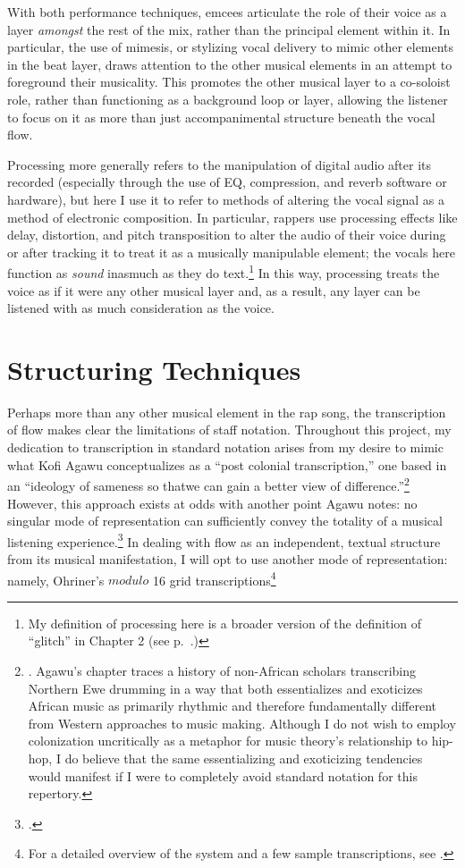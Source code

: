 With both performance techniques, emcees articulate the role of their voice as a layer \emph{amongst} the rest 
of the mix, rather than the principal element within it. In particular, the use of mimesis, or stylizing vocal 
delivery to mimic other elements in the beat layer, draws attention to the other musical elements in an attempt
to foreground their musicality. This promotes the other musical layer to a co-soloist role, rather than 
functioning as a background loop or layer, allowing the listener to focus on it as more than just accompanimental
structure beneath the vocal flow.

Processing more generally refers to the manipulation of digital audio after its recorded (especially through
the use of EQ, compression, and reverb software or hardware), but here I use it to refer to methods of altering
the vocal signal as a method of electronic composition. In particular, rappers use processing effects like delay, 
distortion, and pitch transposition to alter the audio of their voice during or after tracking it to treat it 
as a musically manipulable element; the vocals here function as \emph{sound} inasmuch as they do text.\footnote{
    My definition of processing here is a broader version of the definition of ``glitch'' in Chapter 2 
    (see p.~\pageref{glitch}.)}
In this way, processing treats the voice as if it were any other musical layer and, as a result, any layer can
be listened with as much consideration as the voice.


\section{Structuring Techniques}
Perhaps more than any other musical element in the rap song, the transcription of flow makes clear the
limitations of staff notation. Throughout this project, my dedication to transcription in standard notation
arises from my desire to mimic what Kofi Agawu conceptualizes as a ``post colonial transcription,'' one based
in an ``ideology of sameness so that\textellipsis we can gain a better view of difference.''\footnote{
    \autocite[67]{kofiagawuInventionAfricanRhythm2003}. Agawu's chapter traces a history of non-African scholars
    transcribing Northern Ewe drumming in a way that both essentializes and exoticizes African music as primarily
    rhythmic and therefore fundamentally different from Western approaches to music making. Although I do not wish
    to employ colonization uncritically as a metaphor for music theory's relationship to hip-hop, I do believe that
    the same essentializing and exoticizing tendencies would manifest if I were to completely avoid standard notation
    for this repertory.}
However, this approach exists at odds with another point Agawu notes: no singular mode of representation can 
sufficiently convey the totality of a musical listening experience.\footnote{
    \autocite[187]{kofiagawuAfricanRhythmNorthern1995}.}
In dealing with flow as an independent, textual structure from its musical manifestation, I will opt to use
another mode of representation: namely, Ohriner's $modulo$ 16 grid transcriptions\footnote{
    For a detailed overview of the system and a few sample transcriptions, see 
    \autocite[xxviii--xl, 7--9]{mitchellohrinerFlowRhythmicVoice2019}.}

